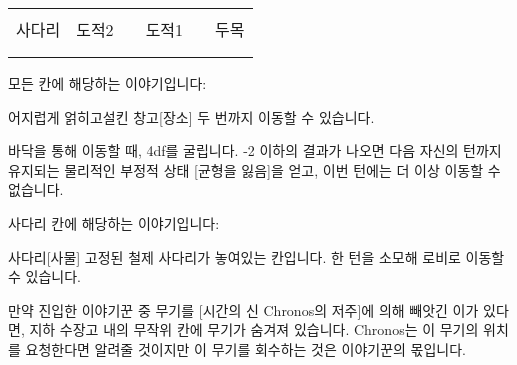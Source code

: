 \documentclass{report}
\begin{document}
	\begin{tabular}{|p{2cm}|p{2cm}|p{2cm}|p{2cm}|p{2cm}|p{2cm}|}
		\hline
		&     &  &     &  &    \\ \hline
		&     &  &     &  &    \\ \hline
		사다리 & 도적2 &  & 도적1 &  & 두목 \\ \hline
		&     &  &     &  &    \\ \hline
		&     &  &     &  &    \\ \hline
	\end{tabular}
	
	모든 칸에 해당하는 이야기입니다:
	\begin{spoiler}{어지럽게 얽히고설킨 창고}{[장소]}
		두 번까지 이동할 수 있습니다.
		
		바닥을 통해 이동할 때, 4df를 굴립니다. -2 이하의 결과가 나오면 다음 자신의 턴까지 유지되는 물리적인 부정적 상태 [균형을 잃음]을 얻고, 이번 턴에는 더 이상 이동할 수 없습니다.
	\end{spoiler}
	
	\bigskip
	
	사다리 칸에 해당하는 이야기입니다:
	\begin{spoiler}{사다리}{[사물]}
		고정된 철제 사다리가 놓여있는 칸입니다. 한 턴을 소모해 로비로 이동할 수 있습니다.
	\end{spoiler}
	
	만약 진입한 이야기꾼 중 무기를 [시간의 신 Chronos의 저주]에 의해 빼앗긴 이가 있다면, 지하 수장고 내의 무작위 칸에 무기가 숨겨져 있습니다. Chronos는 이 무기의 위치를 요청한다면 알려줄 것이지만 이 무기를 회수하는 것은 이야기꾼의 몫입니다.
\end{document}
